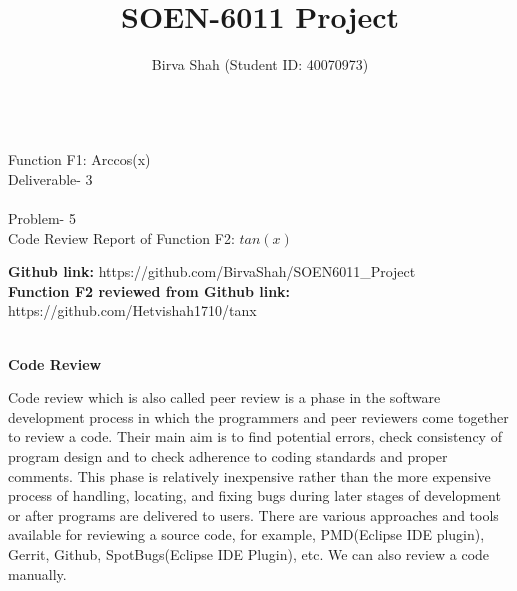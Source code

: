 \documentclass[10pt,letterpaper]{article}
\author{Birva Shah (Student ID: 40070973)}
\title{SOEN-6011 Project}
\begin{document}
\maketitle
\begin{large}
\begin{center}
\\\Large Function F1: Arccos(x)\\
\LARGE Deliverable- 3\\
\\\Large Problem- 5
\\\Large Code Review Report of Function F2: $tan(x)$
\end{center}
\end{large}
\textbf{Github link:} https://github.com/BirvaShah/SOEN6011\_Project
\\
\textbf{Function F2 reviewed from Github link:} https://github.com/Hetvishah1710/tanx 
\begin{large}
\begin{center}
\\\Large \textbf{Code Review}\\
\end{center}
\end{large}
Code review which is also called peer review is a phase in the software development process in which the programmers and peer reviewers come together to review a code. Their main aim is to find potential errors, check consistency of program design and to check adherence to coding standards and proper comments. This phase is relatively inexpensive rather than the more expensive process of handling, locating, and fixing bugs during later stages of development or after programs are delivered to users. There are various approaches and tools available for reviewing a source code, for example, PMD(Eclipse IDE plugin), Gerrit, Github, SpotBugs(Eclipse IDE Plugin), etc. We can also review a code manually. 
\end{document}
